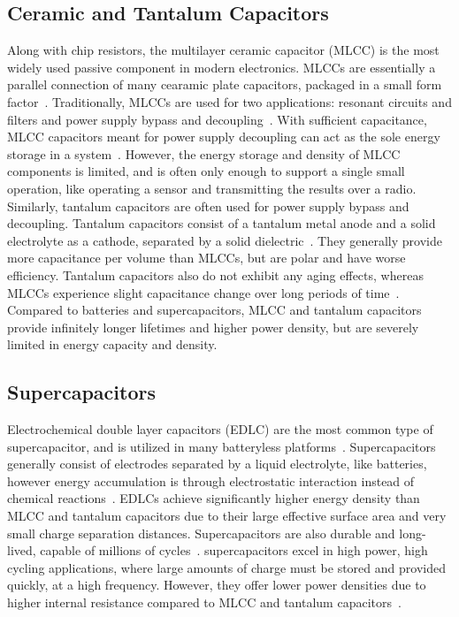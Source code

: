 \subsection{Ceramic and Tantalum Capacitors}
Along with chip resistors, the multilayer ceramic capacitor (MLCC) is the most widely used passive component in modern electronics. MLCCs are essentially a parallel connection of many cearamic plate capacitors, packaged in a small form factor~\cite{pan2010brief}. Traditionally, MLCCs are used for two applications: resonant circuits and filters and power supply bypass and decoupling~\cite{pan2010brief}. With sufficient capacitance, MLCC capacitors meant for power supply decoupling can act as the sole energy storage in a system~\cite{hesterFlicker17,yervaGrafting12,campbellEnergy14}. However, the energy storage and density of MLCC components is limited, and is often only enough to support a single small operation, like operating a sensor and transmitting the results over a radio. Similarly, tantalum capacitors are often used for power supply bypass and decoupling. Tantalum capacitors consist of a tantalum metal anode and a solid electrolyte as a cathode, separated by a solid dielectric~\cite{gill1994basic}. They generally provide more capacitance per volume than MLCCs, but are polar and have worse efficiency.
Tantalum capacitors also do not exhibit any aging effects, whereas MLCCs experience slight capacitance change over long periods of time~\cite{kemetUpdate}.
Compared to batteries and supercapacitors, MLCC and tantalum capacitors provide infinitely longer lifetimes and higher power density, but are severely limited in energy capacity and density.

\subsection{Supercapacitors}
Electrochemical double layer capacitors (EDLC) are the most common type of supercapacitor, and is utilized in many batteryless platforms~\cite{colinReconfigurable18,libich2018supercapacitors,nardello2019camaroptera}.
Supercapacitors generally consist of electrodes separated by a liquid electrolyte, like batteries, however energy accumulation is through electrostatic interaction instead of chemical reactions~\cite{libich2018supercapacitors,vangari2013supercapacitors}.
EDLCs achieve significantly higher energy density than MLCC and tantalum capacitors due to their large effective surface area and very small charge separation distances. Supercapacitors are also durable and long-lived, capable of millions of cycles~\cite{libich2018supercapacitors}. 
supercapacitors excel in high power, high cycling applications, where large amounts of charge must be stored and provided quickly, at a high frequency.
However, they offer lower power densities due to higher internal resistance compared to MLCC and tantalum capacitors~\cite{vangari2013supercapacitors}. 


